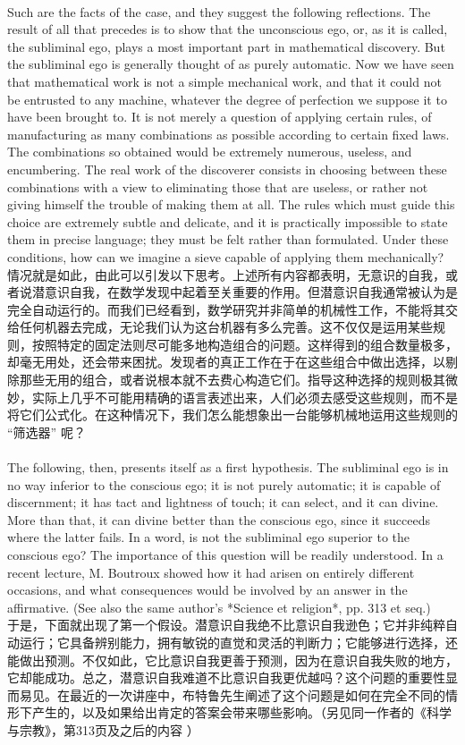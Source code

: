 \documentclass{article}
\begin{document}
\\
Such are the facts of the case, and they suggest the following reflections. The result of all that precedes is to show that the unconscious ego, or, as it is called, the subliminal ego, plays a most important part in mathematical discovery. But the subliminal ego is generally thought of as purely automatic. Now we have seen that mathematical work is not a simple mechanical work, and that it could not be entrusted to any machine, whatever the degree of perfection we suppose it to have been brought to. It is not merely a question of applying certain rules, of manufacturing as many combinations as possible according to certain fixed laws. The combinations so obtained would be extremely numerous, useless, and encumbering. The real work of the discoverer consists in choosing between these combinations with a view to eliminating those that are useless, or rather not giving himself the trouble of making them at all. The rules which must guide this choice are extremely subtle and delicate, and it is practically impossible to state them in precise language; they must be felt rather than formulated. Under these conditions, how can we imagine a sieve capable of applying them mechanically?\\
情况就是如此，由此可以引发以下思考。上述所有内容都表明，无意识的自我，或者说潜意识自我，在数学发现中起着至关重要的作用。但潜意识自我通常被认为是完全自动运行的。而我们已经看到，数学研究并非简单的机械性工作，不能将其交给任何机器去完成，无论我们认为这台机器有多么完善。这不仅仅是运用某些规则，按照特定的固定法则尽可能多地构造组合的问题。这样得到的组合数量极多，却毫无用处，还会带来困扰。发现者的真正工作在于在这些组合中做出选择，以剔除那些无用的组合，或者说根本就不去费心构造它们。指导这种选择的规则极其微妙，实际上几乎不可能用精确的语言表述出来，人们必须去感受这些规则，而不是将它们公式化。在这种情况下，我们怎么能想象出一台能够机械地运用这些规则的 “筛选器” 呢？ \\

\\
The following, then, presents itself as a first hypothesis. The subliminal ego is in no way inferior to the conscious ego; it is not purely automatic; it is capable of discernment; it has tact and lightness of touch; it can select, and it can divine. More than that, it can divine better than the conscious ego, since it succeeds where the latter fails. In a word, is not the subliminal ego superior to the conscious ego? The importance of this question will be readily understood. In a recent lecture, M. Boutroux showed how it had arisen on entirely different occasions, and what consequences would be involved by an answer in the affirmative. (See also the same author’s *Science et religion*, pp. 313 et seq.)\\
于是，下面就出现了第一个假设。潜意识自我绝不比意识自我逊色；它并非纯粹自动运行；它具备辨别能力，拥有敏锐的直觉和灵活的判断力；它能够进行选择，还能做出预测。不仅如此，它比意识自我更善于预测，因为在意识自我失败的地方，它却能成功。总之，潜意识自我难道不比意识自我更优越吗？这个问题的重要性显而易见。在最近的一次讲座中，布特鲁先生阐述了这个问题是如何在完全不同的情形下产生的，以及如果给出肯定的答案会带来哪些影响。（另见同一作者的《科学与宗教》，第313页及之后的内容 ） \\
\end{document}
